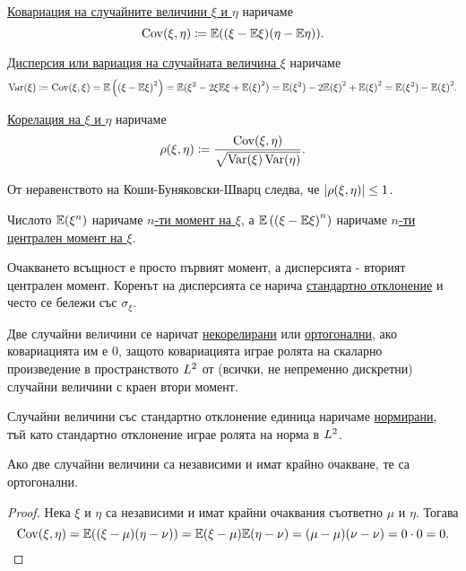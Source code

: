 \documentclass[numbers=endperiod, DIV=15, bibliography=totocnumbered]{scrartcl}
\begin{document}
\begin{definition}
  \uline{Ковариация на случайните величини $\xi$ и $\eta$} наричаме
  \begin{displaymath}
    \operatorname{Cov}(\xi, \eta)
    \coloneqq
    \mathbb{E}((\xi - \mathbb{E} \xi) (\eta - \mathbb{E} \eta)).
  \end{displaymath}

  \uline{Дисперсия или вариация на случайната величина $\xi$} наричаме
  \begin{displaymath}
    \operatorname{Var}(\xi)
    \coloneqq
    \operatorname{Cov}(\xi, \xi)
    =
    \mathbb{E} \left({(\xi - \mathbb{E} \xi)}^2 \right)
    =
    \mathbb{E}(\xi^2 - 2 \xi \mathbb{E} \xi + {\mathbb{E}(\xi)}^2)
    =
    \mathbb{E}(\xi^2) - 2 {\mathbb{E}(\xi)}^2 + {\mathbb{E}(\xi)}^2
    =
    \mathbb{E}(\xi^2) - {\mathbb{E}(\xi)}^2.
  \end{displaymath}

  \uline{Корелация на $\xi$ и $\eta$} наричаме
  \begin{displaymath}
    \operatorname{\rho}(\xi, \eta)
    \coloneqq
    \frac {\operatorname{Cov}(\xi, \eta)} {\sqrt{\operatorname{Var}(\xi) \operatorname{Var}(\eta)}}.
  \end{displaymath}

  От неравенството на Коши-Буняковски-Шварц следва, че $\left\vert \operatorname{\rho}(\xi, \eta) \right\vert \leq 1$.

  Числото $\mathbb{E}(\xi^n)$ наричаме \uline{$n$-ти момент на $\xi$}, а $\mathbb{E} \left( {(\xi - \mathbb{E} \xi)}^n \right)$ наричаме \uline{$n$-ти централен момент на $\xi$}.

  Очакването всъщност е просто първият момент, а дисперсията - вторият централен момент. Коренът на дисперсията се нарича \uline{стандартно отклонение} и често се бележи със $\sigma_\xi$.

  Две случайни величини се наричат \uline{некорелирани} или \uline{ортогонални}, ако ковариацията им е $0$, защото ковариацията играе ролята на скаларно произведение в пространството $L^2$ от (всички, не непременно дискретни) случайни величини с краен втори момент.

  Случайни величини със стандартно отклонение единица наричаме \uline{нормирани}, тъй като стандартно отклонение играе ролята на норма в $L^2$.
\end{definition}

\begin{proposition}\label{thm:orthogonal-if-independent}
  Ако две случайни величини са независими и имат крайно очакване, те са ортогонални.
\end{proposition}
\begin{proof}
  Нека $\xi$ и $\eta$ са независими и имат крайни очаквания съответно $\mu$ и $\eta$. Тогава
  \begin{displaymath}
    \operatorname{Cov}(\xi, \eta)
    =
    \mathbb{E}((\xi - \mu) (\eta - \nu))
    =
    \mathbb{E}(\xi - \mu) \mathbb{E}(\eta - \nu)
    =
    (\mu - \mu) (\nu - \nu)
    =
    0 \cdot 0
    =
    0.
  \end{displaymath}
\end{proof}
\end{document}
